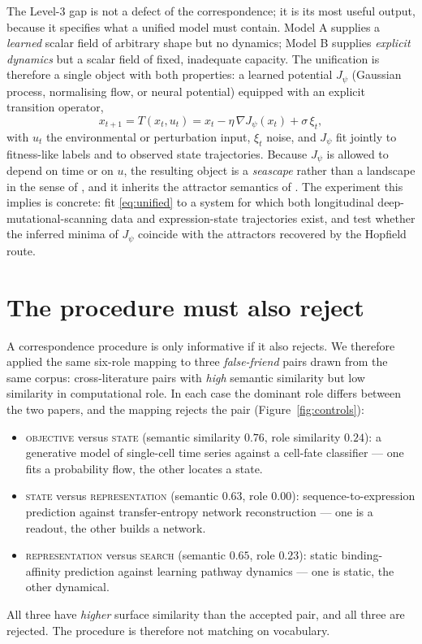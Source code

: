 \documentclass[11pt]{article}
\begin{document}
The Level-3 gap is not a defect of the correspondence; it is its most useful output, because it specifies what a
unified model must contain. Model A supplies a \emph{learned} scalar field of arbitrary shape but no dynamics;
Model B supplies \emph{explicit dynamics} but a scalar field of fixed, inadequate capacity. The unification is
therefore a single object with both properties: a learned potential $J_\psi$ (Gaussian process, normalising flow, or
neural potential) equipped with an explicit transition operator,
\begin{equation}
x_{t+1} = T\!\left(x_t,u_t\right) = x_t - \eta \,\nabla J_\psi(x_t) + \sigma\,\xi_t ,
\label{eq:unified}
\end{equation}
with $u_t$ the environmental or perturbation input, $\xi_t$ noise, and $J_\psi$ fit jointly to fitness-like labels
and to observed state trajectories. Because $J_\psi$ is allowed to depend on time or on $u$, the resulting object is
a \emph{seascape} rather than a landscape in the sense of \citet{mustonen2009seascapes}, and it inherits the
attractor semantics of \citet{wang2011waddington}. The experiment this implies is concrete: fit
\eqref{eq:unified} to a system for which both longitudinal deep-mutational-scanning data and expression-state
trajectories exist, and test whether the inferred minima of $J_\psi$ coincide with the attractors recovered by the
Hopfield route.

\section{The procedure must also reject}

A correspondence procedure is only informative if it also rejects. We therefore applied the same six-role mapping to
three \emph{false-friend} pairs drawn from the same corpus: cross-literature pairs with \emph{high} semantic
similarity but low similarity in computational role. In each case the dominant role differs between the two papers,
and the mapping rejects the pair (Figure~\ref{fig:controls}):
\begin{itemize}
\item \textsc{objective} versus \textsc{state} (semantic similarity $0.76$, role similarity $0.24$): a generative model
of single-cell time series against a cell-fate classifier --- one fits a probability flow, the other locates a state.
\item \textsc{state} versus \textsc{representation} (semantic $0.63$, role $0.00$): sequence-to-expression prediction
against transfer-entropy network reconstruction --- one is a readout, the other builds a network.
\item \textsc{representation} versus \textsc{search} (semantic $0.65$, role $0.23$): static binding-affinity prediction
against learning pathway dynamics --- one is static, the other dynamical.
\end{itemize}
All three have \emph{higher} surface similarity than the accepted pair, and all three are rejected. The procedure is
therefore not matching on vocabulary.
\end{document}

